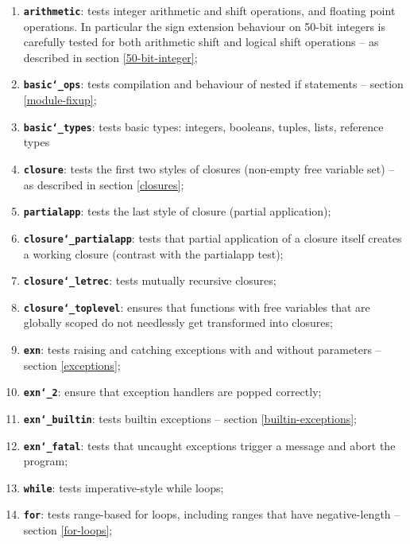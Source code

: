 \documentclass[12pt,a4paper,twoside,openright]{report}
\begin{document}
\begin{enumerate}
    \item \textbf{\texttt{arithmetic}}: tests integer arithmetic and shift
        operations, and floating point operations. In particular the sign
        extension behaviour on 50-bit integers is carefully tested for both
        arithmetic shift and logical shift operations -- as described in
        section \ref{50-bit-integer};
    \item \textbf{\texttt{basic\char`_ops}}: tests compilation and behaviour of
        nested if statements -- section \ref{module-fixup};
    \item \textbf{\texttt{basic\char`_types}}: tests basic types: integers,
        booleans, tuples, lists, reference types
    \item \textbf{\texttt{closure}}: tests the first two styles of closures
        (non-empty free variable set) -- as described in section
        \ref{closures};
    \item \textbf{\texttt{partialapp}}: tests the last style of closure
        (partial application);
    \item \textbf{\texttt{closure\char`_partialapp}}: tests that partial
        application of a closure itself creates a working closure (contrast
        with the partialapp test);
    \item \textbf{\texttt{closure\char`_letrec}}: tests mutually recursive
        closures;
    \item \textbf{\texttt{closure\char`_toplevel}}: ensures that functions with
        free variables that are globally scoped do not needlessly get
        transformed into closures;
    \item \textbf{\texttt{exn}}: tests raising and catching exceptions with and
        without parameters -- section \ref{exceptions};
    \item \textbf{\texttt{exn\char`_2}}: ensure that exception handlers are
        popped correctly;
    \item \textbf{\texttt{exn\char`_builtin}}: tests builtin exceptions --
        section \ref{builtin-exceptions};
    \item \textbf{\texttt{exn\char`_fatal}}: tests that uncaught exceptions
        trigger a message and abort the program;
    \item \textbf{\texttt{while}}: tests imperative-style while loops;
    \item \textbf{\texttt{for}}: tests range-based for loops, including ranges
        that have negative-length -- section \ref{for-loops};

\end{enumerate}
\end{document}
